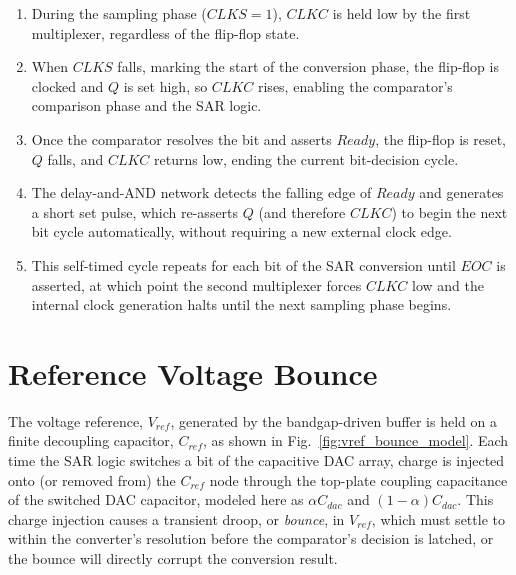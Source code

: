\begin{enumerate}
	\item During the sampling phase ($CLKS = 1$), $CLKC$ is held low by
	the first multiplexer, regardless of the flip-flop state.
	\item When $CLKS$ falls, marking the start of the conversion phase,
	the flip-flop is clocked and $Q$ is set high, so $CLKC$ rises,
	enabling the comparator's comparison phase and the SAR logic.
	\item Once the comparator resolves the bit and asserts $Ready$, the
	flip-flop is reset, $Q$ falls, and $CLKC$ returns low, ending the
	current bit-decision cycle.
	\item The delay-and-AND network detects the falling edge of $Ready$
	and generates a short set pulse, which re-asserts $Q$ (and therefore
	$CLKC$) to begin the next bit cycle automatically, without requiring a
	new external clock edge.
	\item This self-timed cycle repeats for each bit of the SAR
	conversion until $EOC$ is asserted, at which point the second
	multiplexer forces $CLKC$ low and the internal clock generation halts
	until the next sampling phase begins.
\end{enumerate}


\newpage

\section{Reference Voltage Bounce}
\label{sec:vref_bounce}

The voltage reference, $V_{ref}$, generated by the bandgap-driven buffer
is held on a finite decoupling capacitor, $C_{ref}$, as shown in
Fig.~\ref{fig:vref_bounce_model}. Each time the SAR logic switches a bit
of the capacitive DAC array, charge is injected onto (or removed from)
the $C_{ref}$ node through the top-plate coupling capacitance of the
switched DAC capacitor, modeled here as $\alpha C_{dac}$ and
$(1-\alpha) C_{dac}$. This charge injection causes a transient droop, or
\emph{bounce}, in $V_{ref}$, which must settle to within the converter's
resolution before the comparator's decision is latched, or the bounce
will directly corrupt the conversion result.

